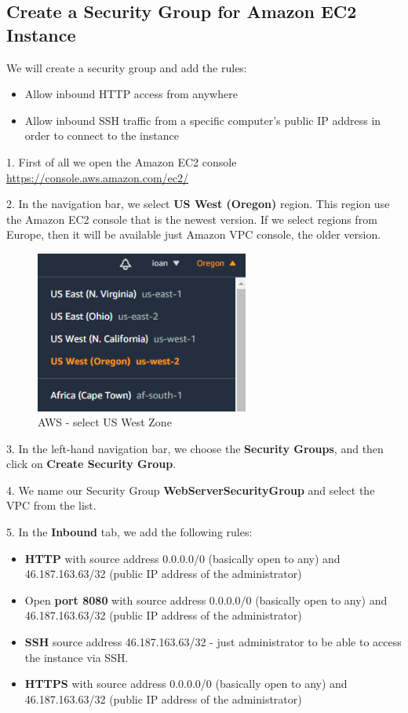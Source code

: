 \documentclass[12pt,a4paper,twoside]{article}
\begin{document}
\subsection{Create a Security Group for Amazon EC2 Instance}


We will create a security group and add the rules:
\begin{itemize}
	\item Allow inbound HTTP access from anywhere
	\item Allow inbound SSH traffic from a specific computer's public IP address in order to connect to the instance
\end{itemize}


1. First of all we open the Amazon EC2 console \url{ https://console.aws.amazon.com/ec2/} 


2. In the navigation bar, we select \textbf{US West (Oregon)} region. This region use the Amazon EC2 console that is the newest version. If we select regions from Europe, then it will be available just Amazon VPC console, the older version.


\begin{figure}[H]
    \centering
        \includegraphics[width=7cm]{images-aws/1-aws-zone.png}
        \caption{AWS - select US West Zone}
\end{figure}


3. In the left-hand navigation bar, we choose the \textbf{Security Groups}, and then click on \textbf{Create Security Group}.


4. We name our Security Group \textbf{WebServerSecurityGroup} and select the VPC from the list.


5. In the \textbf{Inbound} tab, we add the following rules:
\begin{itemize}
	\item \textbf{HTTP} with source address 0.0.0.0/0 (basically open to any) and 46.187.163.63/32 (public IP address of the administrator)
	\item Open \textbf{port 8080} with source address 0.0.0.0/0 (basically open to any) and 46.187.163.63/32 (public IP address of the administrator)
	\item \textbf{SSH}   source address 46.187.163.63/32 - just administrator to be able to access the instance via SSH.
	\item \textbf{HTTPS} with source address 0.0.0.0/0 (basically open to any) and 46.187.163.63/32 (public IP address of the administrator)
\end{itemize}
\end{document}
